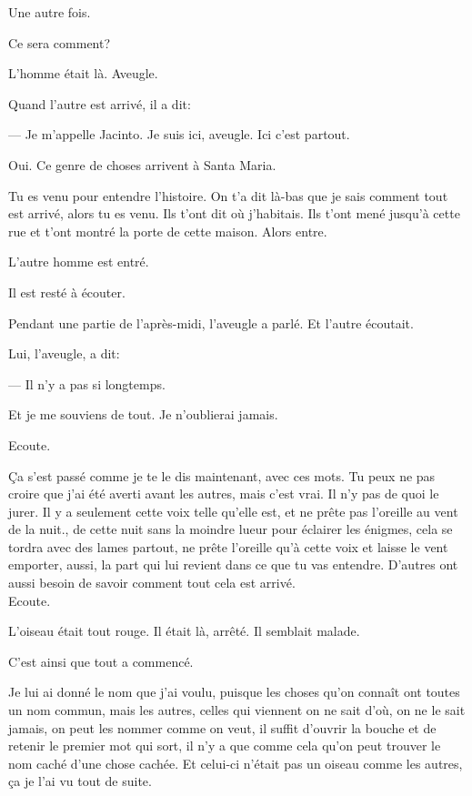 Une autre fois.

Ce sera comment?

\breakk

\vspace*{4cm}

L'homme était là. Aveugle.

Quand l'autre est arrivé, il a dit:

--- Je m'appelle Jacinto. Je suis ici, aveugle. Ici c'est partout.

Oui. Ce genre de choses arrivent à Santa Maria.

Tu es venu pour entendre l'histoire. On t'a dit là-bas que je sais
comment tout est arrivé, alors tu es venu. Ils t'ont dit où j'habitais.
Ils t'ont mené jusqu'à cette rue et t'ont montré la porte de cette
maison. Alors entre.

L'autre homme est entré.

Il est resté à écouter.

Pendant une partie de l'après-midi, l'aveugle a parlé. Et l'autre
écoutait.

Lui, l'aveugle, a dit:

--- Il n'y a pas si longtemps.

Et je me souviens de tout. Je n'oublierai jamais.

Ecoute.

Ça s'est passé comme je te le dis maintenant, avec ces mots. Tu peux ne
pas croire que j'ai été averti avant les autres, mais c'est vrai. Il n'y
pas de quoi le jurer. Il y a seulement cette voix telle qu'elle est, et
ne prête pas l'oreille au vent de la nuit., de cette nuit sans la
moindre lueur pour éclairer les énigmes, cela se tordra avec des lames
partout, ne prête l'oreille qu'à cette voix et laisse le vent emporter,
aussi, la part qui lui revient dans ce que tu vas entendre. D'autres ont
aussi besoin de savoir comment tout cela est arrivé.\\

Ecoute.

L'oiseau était tout rouge. Il était là, arrêté. Il semblait malade.

C'est ainsi que tout a commencé.

Je lui ai donné le nom que j'ai voulu, puisque les choses qu'on connaît
ont toutes un nom commun, mais les autres, celles qui viennent on ne
sait d'où, on ne le sait jamais, on peut les nommer comme on veut, il
suffit d'ouvrir la bouche et de retenir le premier mot qui sort, il n'y
a que comme cela qu'on peut trouver le nom caché d'une chose cachée. Et
celui-ci n'était pas un oiseau comme les autres, ça je l'ai vu tout de
suite.\\

